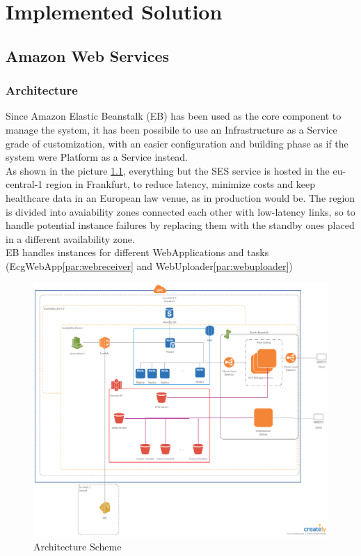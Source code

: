 \chapter{Implemented Solution}
\section{Amazon Web Services}

\subsection{Architecture}
Since Amazon Elastic Beanstalk (EB) has been used as the core component to manage the system, it has been possibile to use an Infrastructure as a Service grade of customization, with an easier configuration and building phase as if the system were Platform as a Service instead.\\
As shown in the picture \ref{fig:architecture}, everything but the SES service is hosted in the eu-central-1 region in Frankfurt, to reduce latency, minimize costs and keep healthcare data in an European law venue, as in production would be.
The region is divided into avaiability zones connected each other with low-latency links, so to handle potential instance failures by replacing them with the standby ones placed in a different availability zone.\\
EB handles instances for different WebApplications and tasks (EcgWebApp\ref{par:webreceiver} and WebUploader\ref{par:webuploader})

\begin{figure}[h]
    \includegraphics[width=\textwidth]{architecture}
    \caption{Architecture Scheme}
    \label{fig:architecture}
\end{figure}
